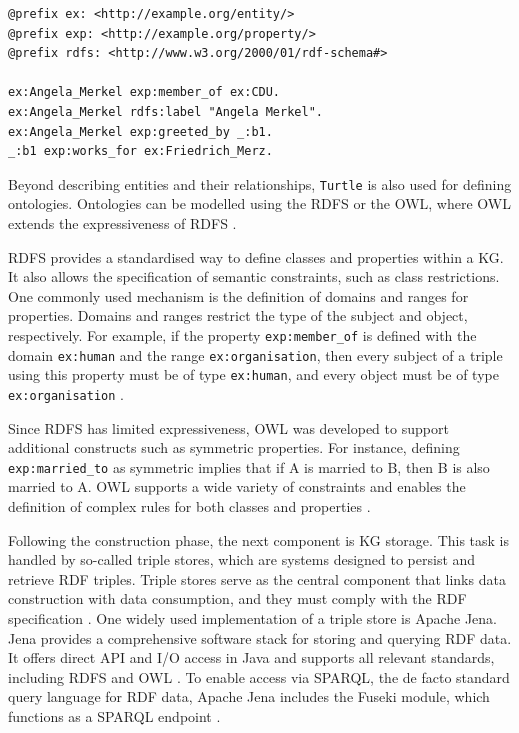\documentclass[a4paper,oneside,bibliography=totoc]{scrbook}
\begin{document}
\begin{lstlisting}[language=Turtle, caption=Example of a Knowledge Graph in \texttt{Turtle} Format with Prefixes, label=lst:turtle_example]
@prefix ex: <http://example.org/entity/>
@prefix exp: <http://example.org/property/>
@prefix rdfs: <http://www.w3.org/2000/01/rdf-schema#>

ex:Angela_Merkel exp:member_of ex:CDU.
ex:Angela_Merkel rdfs:label "Angela Merkel".
ex:Angela_Merkel exp:greeted_by _:b1.
_:b1 exp:works_for ex:Friedrich_Merz.
\end{lstlisting}

Beyond describing entities and their relationships, \texttt{Turtle} is also used for defining ontologies. Ontologies can be modelled using the \ac{RDFS} or the \ac{OWL}, where \ac{OWL} extends the expressiveness of \ac{RDFS} \cite{Gayo2018}.

\ac{RDFS} provides a standardised way to define classes and properties within a \ac{KG}. It also allows the specification of semantic constraints, such as class restrictions. One commonly used mechanism is the definition of domains and ranges for properties. Domains and ranges restrict the type of the subject and object, respectively. For example, if the property \texttt{exp:member\_of} is defined with the domain \texttt{ex:human} and the range \texttt{ex:organisation}, then every subject of a triple using this property must be of type \texttt{ex:human}, and every object must be of type \texttt{ex:organisation} \cite{VillazonTerrazas2017}.

Since \ac{RDFS} has limited expressiveness, \ac{OWL} was developed to support additional constructs such as symmetric properties. For instance, defining \texttt{exp:married\_to} as symmetric implies that if A is married to B, then B is also married to A. \ac{OWL} supports a wide variety of constraints and enables the definition of complex rules for both classes and properties \cite{VillazonTerrazas2017}.

Following the construction phase, the next component is \ac{KG} storage. This task is handled by so-called triple stores, which are systems designed to persist and retrieve \ac{RDF} triples. Triple stores serve as the central component that links data construction with data consumption, and they must comply with the \ac{RDF} specification \cite{Rusher2003}. One widely used implementation of a triple store is Apache Jena. Jena provides a comprehensive software stack for storing and querying \ac{RDF} data. It offers direct API and I/O access in Java and supports all relevant standards, including \ac{RDFS} and \ac{OWL} \cite{Carroll2004}. To enable access via \ac{SPARQL}, the de facto standard query language for RDF data, Apache Jena includes the Fuseki module, which functions as a \ac{SPARQL} endpoint \cite{Chokshi2022}.
\end{document}
